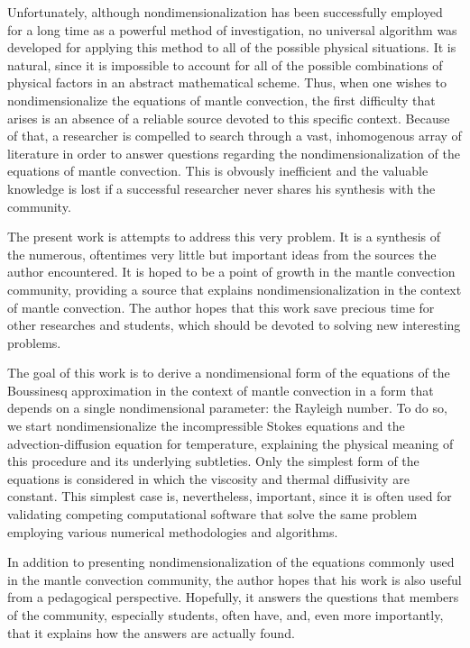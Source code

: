 \documentclass[oneside]{amsbook}
\theoremstyle{definition}
\theoremstyle{remark}
\numberwithin{section}{chapter}
\numberwithin{equation}{chapter}
\begin{document}
Unfortunately, although nondimensionalization has been successfully employed for a long time as a powerful method of investigation, no universal algorithm was developed for applying this method to all of the possible physical situations. It is natural, since it is impossible to account for all of the possible combinations of physical factors in an abstract mathematical scheme. Thus, when one wishes to nondimensionalize the equations of mantle convection, the first difficulty that arises is an absence of a reliable source devoted to this specific context. Because of that, a researcher is compelled to search through a vast, inhomogenous array of literature in order to answer questions regarding the nondimensionalization of the equations of mantle convection. This is obvously inefficient and the valuable knowledge is lost if a successful researcher never shares his synthesis with the community.

The present work is attempts to  address this very problem. It is a synthesis of the numerous, oftentimes very little but important ideas from the sources the author encountered. It is hoped to be a point of growth in the mantle convection community, providing a source that explains nondimensionalization in the context of mantle convection. The author hopes that this work save precious time for other researches and students, which should be devoted to solving new interesting problems. 

The goal of this work is to derive a nondimensional form of the equations of the Boussinesq approximation in the context of mantle convection in a form that depends on a single nondimensional parameter: the Rayleigh number. To do so, we start nondimensionalize the incompressible Stokes equations and the advection-diffusion equation for temperature, explaining the physical meaning of this procedure and its underlying subtleties. Only the simplest form of the equations is considered in which the viscosity and thermal diffusivity are constant. This simplest case is, nevertheless, important, since it is often used for validating competing computational software that solve the same problem employing various numerical methodologies and algorithms.

In addition to presenting nondimensionalization of the equations commonly used in the mantle convection community, the author hopes that his work is also useful from a pedagogical perspective. Hopefully, it answers the questions that members of the community, especially students, often have, and, even more importantly, that it explains how the answers are actually found.
\end{document}
